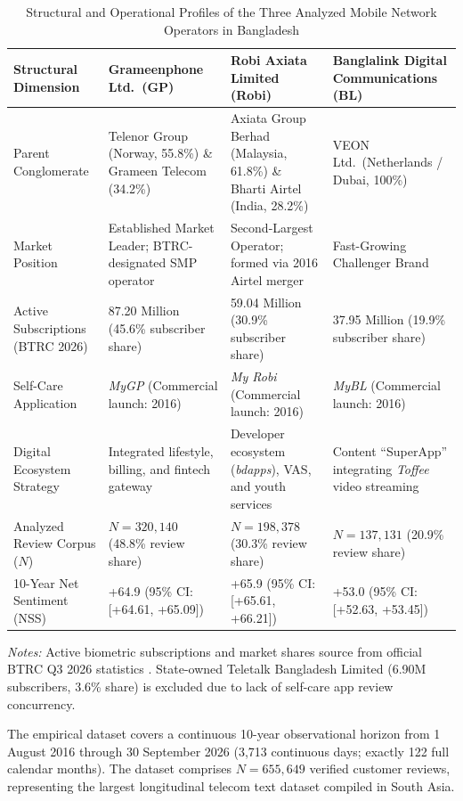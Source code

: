\documentclass[review,12pt,authoryear]{elsarticle}
\begin{document}
\begin{table}[t]
\centering
\caption{Structural and Operational Profiles of the Three Analyzed Mobile Network Operators in Bangladesh}
\label{tab:operator_profile}
\footnotesize
\setlength{\tabcolsep}{5pt}
\begin{tabularx}{\textwidth}{@{}lXXX@{}}
\toprule
Structural Dimension & Grameenphone Ltd.\ (GP) & Robi Axiata Limited (Robi) & Banglalink Digital Communications (BL) \\
\midrule
Parent Conglomerate & Telenor Group (Norway, 55.8\%) \& Grameen Telecom (34.2\%) & Axiata Group Berhad (Malaysia, 61.8\%) \& Bharti Airtel (India, 28.2\%) & VEON Ltd.\ (Netherlands / Dubai, 100\%) \\
Market Position & Established Market Leader; BTRC-designated SMP operator & Second-Largest Operator; formed via 2016 Airtel merger & Fast-Growing Challenger Brand \\
Active Subscriptions (BTRC 2026) & 87.20 Million (45.6\% subscriber share) & 59.04 Million (30.9\% subscriber share) & 37.95 Million (19.9\% subscriber share) \\
Self-Care Application & \textit{MyGP} (Commercial launch: 2016) & \textit{My Robi} (Commercial launch: 2016) & \textit{MyBL} (Commercial launch: 2016) \\
Digital Ecosystem Strategy & Integrated lifestyle, billing, and fintech gateway & Developer ecosystem (\textit{bdapps}), VAS, and youth services & Content ``SuperApp'' integrating \textit{Toffee} video streaming \\
Analyzed Review Corpus ($N$) & $N = 320{,}140$ (48.8\% review share) & $N = 198{,}378$ (30.3\% review share) & $N = 137{,}131$ (20.9\% review share) \\
10-Year Net Sentiment (NSS) & +64.9 (95\% CI: [+64.61, +65.09]) & +65.9 (95\% CI: [+65.61, +66.21]) & +53.0 (95\% CI: [+52.63, +53.45]) \\
\bottomrule
\end{tabularx}
\vspace{0.4em}
\parbox{\textwidth}{\footnotesize \textit{Notes:} Active biometric subscriptions and market shares source from official BTRC Q3 2026 statistics \citep{btrc2026quarterly}. State-owned Teletalk Bangladesh Limited (6.90M subscribers, 3.6\% share) is excluded due to lack of self-care app review concurrency.}
\end{table}

The empirical dataset covers a continuous 10-year observational horizon from 1 August 2016 through 30 September 2026 (3,713 continuous days; exactly 122 full calendar months). The dataset comprises $N = 655{,}649$ verified customer reviews, representing the largest longitudinal telecom text dataset compiled in South Asia.
\end{document}
